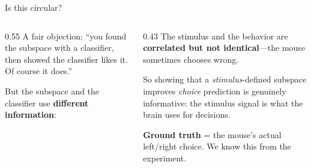 \documentclass[aspectratio=169,11pt]{beamer}
\begin{document}
\begin{frame}{Is this circular?}
\begin{columns}[T]
\begin{column}{0.55\textwidth}
{\small A fair objection: ``you found the subspace with a classifier, then showed the classifier likes it. Of course it does.''}

\vspace{0.5em}
{\small But the subspace and the classifier use \textbf{different information}:}

\vspace{0.8em}

\end{column}
\begin{column}{0.43\textwidth}
\vspace{0.5em}
{\small The stimulus and the behavior are \textbf{correlated but not identical}---the mouse sometimes chooses wrong.}

\vspace{0.5em}
{\small So showing that a \emph{stimulus}-defined subspace improves \emph{choice} prediction is genuinely informative: the stimulus signal is what the brain uses for decisions.}

\vspace{0.5em}
{\small \textbf{Ground truth} = the mouse's actual left/right choice. We know this from the experiment.}
\end{column}
\end{columns}
\end{frame}
\end{document}
